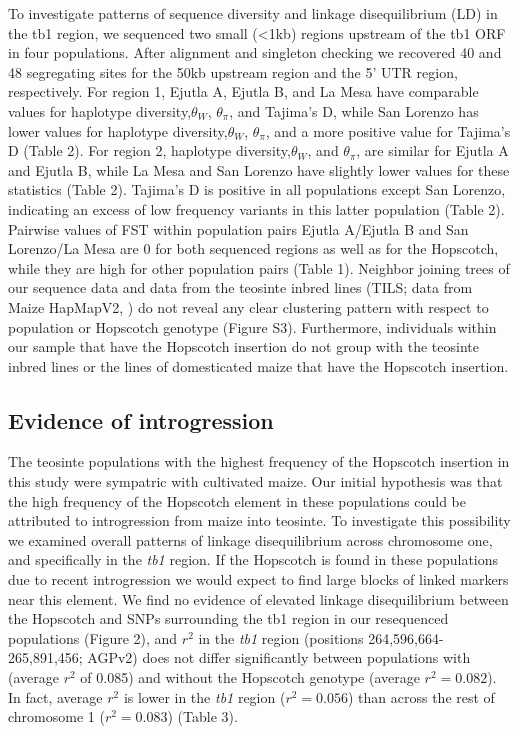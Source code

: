 \documentclass[12pt]{article}
\begin{document}
To investigate patterns of sequence diversity and linkage disequilibrium (LD) in the tb1 region, we sequenced two small (<1kb) regions upstream of the tb1 ORF in four populations. After alignment and singleton checking we recovered 40 and 48 segregating sites for the 50kb upstream region and the 5' UTR region, respectively. For region 1, Ejutla A, Ejutla B, and La Mesa have comparable values for haplotype diversity,$\theta_{W}$, $\theta_{\pi}$, and Tajima's D, while San Lorenzo has lower values for haplotype diversity,$\theta_{W}$, $\theta_{\pi}$, and a more positive value for Tajima's D (Table 2). For region 2, haplotype diversity,$\theta_{W}$, and $\theta_{\pi}$, are similar for Ejutla A and Ejutla B, while La Mesa and San Lorenzo have slightly lower values for these statistics (Table 2). Tajima's D is positive in all populations except San Lorenzo, indicating an excess of low frequency variants in this latter population (Table 2). Pairwise values of FST within population pairs Ejutla A/Ejutla B and San Lorenzo/La Mesa are 0 for both sequenced regions as well as for the Hopscotch, while they are high for other population pairs (Table 1). Neighbor joining trees of our sequence data and data from the teosinte inbred lines (TILS; data from Maize HapMapV2, \cite{Chia et al 2012}) do not reveal any clear clustering pattern with respect to population or Hopscotch genotype (Figure S3). Furthermore, individuals within our sample that have the Hopscotch insertion do not group with the teosinte inbred lines or the lines of domesticated maize that have the Hopscotch insertion. 

\subsection*{Evidence of introgression}

The teosinte populations with the highest frequency of the Hopscotch insertion in this study were sympatric with cultivated maize. Our initial hypothesis was that the high frequency of the Hopscotch element in these populations could be attributed to introgression from maize into teosinte. To investigate this possibility we examined overall patterns of linkage disequilibrium across chromosome one, and specifically in the \emph{tb1} region. If the Hopscotch is found in these populations due to recent introgression we would expect to find large blocks of linked markers near this element. We find no evidence of elevated linkage disequilibrium between the Hopscotch and SNPs surrounding the tb1 region in our resequenced populations (Figure 2), and $r^{2}$ in the \emph{tb1} region (positions 264,596,664-265,891,456; AGPv2) does not differ significantly between populations with (average $r^{2}$ of 0.085) and without the Hopscotch genotype (average $r^{2}=0.082$). In fact, average $r^{2}$ is lower in the \emph{tb1} region ($r^{2}=0.056$) than across the rest of chromosome 1 ($r^{2}=0.083$) (Table 3). 
\end{document}
